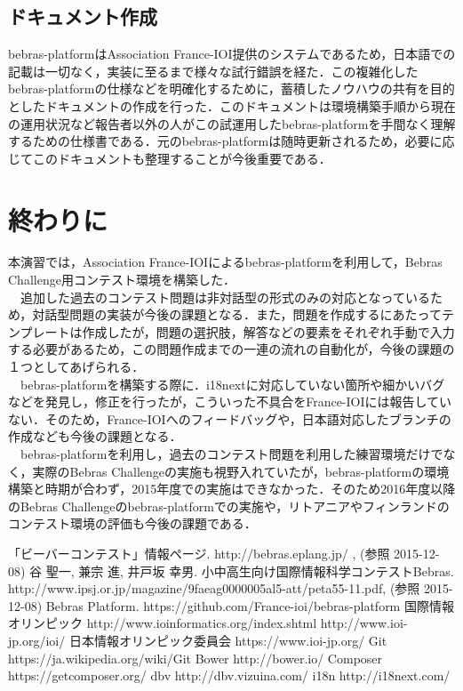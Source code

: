 \documentclass[a4paper]{jarticle}
\begin{document}
\begin{multicols}{2}
\subsection{ドキュメント作成}
bebras-platformはAssociation France-IOI提供のシステムであるため，日本語での記載は一切なく，実装に至るまで様々な試行錯誤を経た．この複雑化したbebras-platformの仕様などを明確化するために，蓄積したノウハウの共有を目的としたドキュメントの作成を行った．このドキュメントは環境構築手順から現在の運用状況など報告者以外の人がこの試運用したbebras-platformを手間なく理解するための仕様書である．元のbebras-platformは随時更新されるため，必要に応じてこのドキュメントも整理することが今後重要である．

\section{終わりに}
本演習では，Association France-IOIによるbebras-platformを利用して，Bebras Challenge用コンテスト環境を構築した．
\\　追加した過去のコンテスト問題は非対話型の形式のみの対応となっているため，対話型問題の実装が今後の課題となる．また，問題を作成するにあたってテンプレートは作成したが，問題の選択肢，解答などの要素をそれぞれ手動で入力する必要があるため，この問題作成までの一連の流れの自動化が，今後の課題の１つとしてあげられる．
\\　bebras-platformを構築する際に．i18nextに対応していない箇所や細かいバグなどを発見し，修正を行ったが，こういった不具合をFrance-IOIには報告していない．そのため，France-IOIへのフィードバッグや，日本語対応したブランチの作成なども今後の課題となる．
\\　bebras-platformを利用し，過去のコンテスト問題を利用した練習環境だけでなく，実際のBebras Challengeの実施も視野入れていたが，bebras-platformの環境構築と時期が合わず，2015年度での実施はできなかった．そのため2016年度以降のBebras Challengeのbebras-platformでの実施や，リトアニアやフィンランドのコンテスト環境の評価も今後の課題である．

\end{multicols}

\begin{thebibliography}{1}

 「ビーバーコンテスト」情報ページ.  http://bebras.eplang.jp/ , (参照 2015-12-08)
 谷 聖一, 兼宗 進, 井戸坂 幸男. 小中高生向け国際情報科学コンテストBebras.  http://www.ipsj.or.jp/magazine/9faeag0000005al5-att/peta55-11.pdf, (参照 2015-12-08)
 Bebras Platform. https://github.com/France-ioi/bebras-platform
 国際情報オリンピック http://www.ioinformatics.org/index.shtml   http://www.ioi-jp.org/ioi/
日本情報オリンピック委員会 https://www.ioi-jp.org/
 Git  https://ja.wikipedia.org/wiki/Git
Bower  http://bower.io/
Composer  https://getcomposer.org/
dbv  http://dbv.vizuina.com/
i18n  http://i18next.com/



\end{thebibliography}
\end{document}
